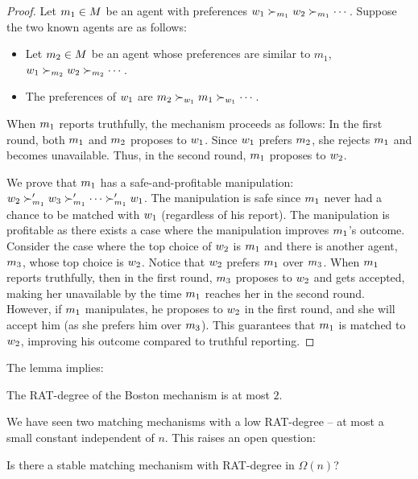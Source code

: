 \begin{lemmarep}
\label{lem:prop-boston}
\end{lemmarep}
\begin{proof}
Let $m_1 \in M$ be an agent with preferences $w_1 \succ_{m_1} w_2 \succ_{m_1} \cdots$.
Suppose the two known agents are as follows:
\begin{itemize}
\item Let $m_2 \in M$ be an agent whose preferences are similar to $m_1$, $w_1 \succ_{m_2} w_2 \succ_{m_2} \cdots$.
\item The preferences of $w_1$ are $m_2 \succ_{w_1} m_1 \succ_{w_1} \cdots$.
\end{itemize}

When $m_1$ reports truthfully, the mechanism proceeds as follows: In the first round, both $m_1$ and $m_2$ proposes to $w_1$. Since $w_1$ prefers $m_2$, she rejects $m_1$ and becomes unavailable. Thus, in the second round, $m_1$ proposes to $w_2$.

We prove that $m_1$ has a safe-and-profitable manipulation: $w_2 \succ'_{m_1} w_3 \succ'_{m_1} \cdots \succ'_{m_1} w_1$.
The manipulation is safe since $m_1$ never had a chance to be matched with $w_1$ (regardless of his report). 
The manipulation is profitable as there exists a case where the manipulation improves $m_1$’s outcome. Consider the case where the top choice of $w_2$ is $m_1$ and there is another agent, $m_3$, whose top choice is $w_2$. 
Notice that $w_2$ prefers $m_1$ over $m_3$. 
When $m_1$ reports truthfully, then in the first round, $m_3$ proposes to $w_2$ and gets accepted, making her unavailable by the time $m_1$ reaches her in the second round.
However, if $m_1$ manipulates, he proposes to $w_2$ in the first round, and she will accept him (as she prefers him over $m_3$). This guarantees that $m_1$ is matched to $w_2$, improving his outcome compared to truthful reporting.
\end{proof}

The lemma implies:
\begin{theoremrep}
    \label{prop-boston}
    The RAT-degree of the Boston mechanism is at most $2$.
\end{theoremrep}

We have seen two matching mechanisms with a low RAT-degree -- at most a small constant independent of $n$. This raises an open question:

\begin{open}
Is there a stable matching mechanism with RAT-degree in $\Omega(n)$?
\end{open}

